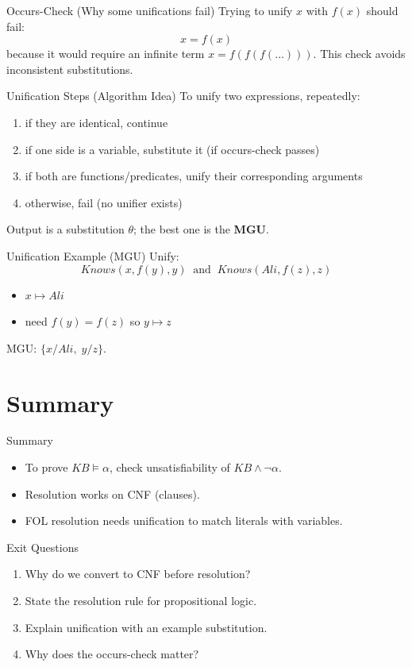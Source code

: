 \documentclass[aspectratio=169]{beamer}
\begin{document}
\begin{frame}{Occurs-Check (Why some unifications fail)}
  Trying to unify $x$ with $f(x)$ should fail:
  \[
    x = f(x)
  \]
  because it would require an infinite term $x = f(f(f(\dots)))$.
  \vspace{0.4em}
  This check avoids inconsistent substitutions.
\end{frame}

\begin{frame}{Unification Steps (Algorithm Idea)}
  To unify two expressions, repeatedly:
  \begin{enumerate}[<+->]
    \item if they are identical, continue
    \item if one side is a variable, substitute it (if occurs-check passes)
    \item if both are functions/predicates, unify their corresponding arguments
    \item otherwise, fail (no unifier exists)
  \end{enumerate}
  \vspace{0.3em}
  Output is a substitution $\theta$; the best one is the \textbf{MGU}.
\end{frame}

\begin{frame}{Unification Example (MGU)}
  Unify:
  \[
    Knows(x, f(y), y)\;\;\text{and}\;\; Knows(Ali, f(z), z)
  \]
  \begin{itemize}[<+->]
    \item $x \mapsto Ali$
    \item need $f(y)=f(z)$ so $y \mapsto z$
  \end{itemize}
  MGU: $\{x/Ali,\; y/z\}$.
\end{frame}

\section{Summary}
\label{sec:summary}

\begin{frame}{Summary}
  \begin{itemize}
    \item To prove $KB \models \alpha$, check unsatisfiability of $KB \land \lnot \alpha$.
    \item Resolution works on CNF (clauses).
    \item FOL resolution needs unification to match literals with variables.
  \end{itemize}
  \slidesources{\AIMLUnitIISources}
\end{frame}

\begin{frame}{Exit Questions}
  \begin{enumerate}
    \item Why do we convert to CNF before resolution?
    \item State the resolution rule for propositional logic.
    \item Explain unification with an example substitution.
    \item Why does the occurs-check matter?
  \end{enumerate}
\end{frame}
\end{document}
